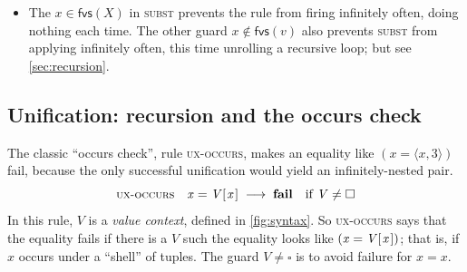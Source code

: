 \documentclass[acmsmall,review,dvipsnames]{acmart}
\newcommand{\Conid}[1]{\mathit{#1}}
\newcommand{\Varid}[1]{\mathit{#1}}
\newcommand{\rulename}[1]{\textsc{\small #1}}
\newcommand{\hole}{\square}
\newcommand{\freevars}[1]{\mathsf{fvs}(#1)}
\newcommand{\movesto}{\longrightarrow}
\begin{document}
\begin{itemize}
That restriction is the key to localizing unification (\cref{sec:mixing}), and
the flexible/rigid distinction of
\cref{sec:rigid}. For example, consider the expression
\ensuremath{(\Varid{y}\mathrel{=}((\Varid{x}\mathrel{=}\mathrm{3};\,\Varid{x}\mathbin{*}\mathrm{2})\;\rule[-0.3mm]{0.5mm}{2.5mm}\;(\Varid{x}\mathrel{=}\mathrm{4}));\,\langle{}\Varid{x}\mathbin{+}\mathrm{1},\Varid{y}\rangle)}.
We must not propagate the binding \ensuremath{(\Varid{x}\mathrel{=}\mathrm{3})} to the expression \ensuremath{(\Varid{x}\mathbin{+}\mathrm{1})},
because the latter is outside the choice, and a different branch of the choice binds \ensuremath{\Varid{x}} to \ensuremath{\mathrm{4}}.
But rule \rulename{subst}
\emph{can} propagate it locally
within the first arm of the choice, thus\footnote{
You may wonder if this local propagation is useful, a point we return
to in \cref{sec:local-subst}.}:
$$
\ensuremath{\Varid{y}\mathrel{=}((\Varid{x}\mathrel{=}\mathrm{3};\,\Varid{x}\mathbin{*}\mathrm{2})\;\rule[-0.3mm]{0.5mm}{2.5mm}\;(\Varid{x}\mathrel{=}\mathrm{4}));\,\langle{}\Varid{x}\mathbin{+}\mathrm{1},\Varid{y}\rangle}
\movesto
\ensuremath{\Varid{y}\mathrel{=}((\Varid{x}\mathrel{=}\mathrm{3};\,\mathrm{3}\mathbin{*}\mathrm{2})\;\rule[-0.3mm]{0.5mm}{2.5mm}\;(\Varid{x}\mathrel{=}\mathrm{4}));\,\langle{}\Varid{x}\mathbin{+}\mathrm{1},\Varid{y}\rangle}
$$
To make further progress, we need a rule for choice, see \cref{sec:choice-rules}.
\item The $x \in \freevars{X}$ in \rulename{subst} prevents the rule from
  firing infinitely often, doing nothing each time.  The other guard $x \not\in \freevars{v}$
  also prevents \rulename{subst} from applying infinitely often, this time unrolling a recursive loop; but
  see \cref{sec:recursion}.
\end{itemize}


\subsection{Unification: recursion and the occurs check} \label{sec:occurs} \label{sec:recursion}

The classic ``occurs check'', rule \rulename{ux-occurs}, makes an equality like \ensuremath{(\Varid{x}\mathrel{=}\langle{}\Varid{x},\mathrm{3}\rangle)} fail, because the only successful
unification would yield an infinitely-nested pair.
$$
    \rulename{ux-occurs} \quad \ensuremath{\Varid{x}\mathrel{=}\Conid{V} [\mskip1.5mu \Varid{x}\mskip1.5mu]} \; \movesto \; \ensuremath{\textbf{fail}} \quad \text{if }\ensuremath{\Conid{V}} \ne \ensuremath{\hole}
$$
In this rule, \ensuremath{\Conid{V}} is a \emph{value context}, defined in \cref{fig:syntax}.
So \rulename{ux-occurs} says that the equality fails if there is a \ensuremath{\Conid{V}} such the equality looks like \ensuremath{(\Varid{x}\mathrel{=}\Conid{V} [\mskip1.5mu \Varid{x}\mskip1.5mu])};
that is, if \ensuremath{\Varid{x}} occurs under a ``shell'' of tuples.  The guard $\ensuremath{\Conid{V}} \ne \ensuremath{\hole}$ is to avoid failure for \ensuremath{\Varid{x}\mathrel{=}\Varid{x}}.
\end{document}
